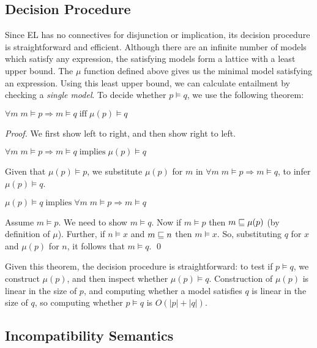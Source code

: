 \subsection{Decision Procedure}
Since EL has no connectives for disjunction or implication, its decision procedure is straightforward and efficient. 
Although there are an infinite number of models which satisfy any expression, the satisfying models form a lattice with a least upper bound. 
The $\mu$ function defined above gives us the minimal model satisfying an expression.
Using this least upper bound, we can calculate entailment by checking a \emph{single model}.
To decide whether $p \models q$,  we use the following theorem:
\begin{theorem} $\forall m \; m \models p \Rightarrow m \models q \; \text{iff} \; \mu(p) \models q $
\end{theorem}
\begin{proof}
We first show left to right, and then show right to left.
\setcounter{mycase}{0}
\begin{mycase}
$\forall m \; m \models p \Rightarrow m \models q \; \text{implies} \; \mu(p) \models q$
\end{mycase}
Given that $\mu(p) \models p$, we substitute $\mu(p)$ for $m$ in $\forall m \; m \models p \Rightarrow m \models q$, to infer $\mu(p) \models q$.
\begin{mycase}
$\mu(p) \models q \; \text{implies} \; \forall m \; m \models p \Rightarrow m \models q$
\end{mycase}
Assume $m \models p$. We need to show $m \models q$.
Now if $m \models p$ then $m \sqsubseteq \mu(p)$ (by definition of $\mu$).
Further, if $n \models x$ and $m \sqsubseteq n$ then $m \models x$. So, substituting $q$ for $x$ and $\mu(p)$ for $n$, it follows that $m \models q$. 
\qed
\end{proof}
Given this theorem, the decision procedure is straightforward: to test if $p \models q$, we construct $\mu(p)$, and then inspect whether $\mu(p) \models q$.
Construction of $\mu(p)$ is linear in the size of $p$, and computing whether a model satisfies $q$ is linear in the size of $q$, so computing whether $p \models q$ is $O(|p|+|q|)$.




\subsection{Incompatibility Semantics}

